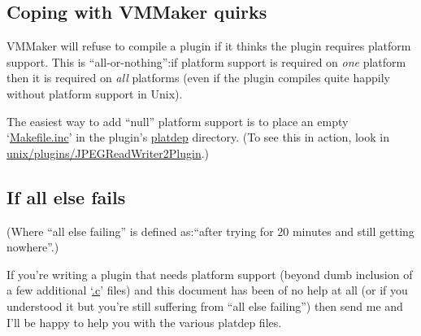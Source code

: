 \documentclass{article}
\newcommand{\cmd}{\url}
\newcommand{\cmd}{\texttt}
\begin{document}
\subsection{Coping with VMMaker quirks}

VMMaker
will refuse to compile a plugin if it thinks the plugin
requires platform support.  This is ``all-or-nothing'':\@ if platform
support is required on \emph{one} platform then it is required on
\emph{all} platforms (even if the plugin compiles quite happily
without platform support in Unix).

The easiest way to add ``null'' platform support is to place an empty
`\cmd{Makefile.inc}' in the plugin's \cmd{platdep} directory.  (To see
this in action, look in \cmd{unix/plugins/JPEGReadWriter2Plugin}.)

\subsection{If all else fails}

(Where
``all else failing'' is defined as:\@ ``after trying for 20
minutes and still getting nowhere''.)

If you're writing a plugin that needs platform support (beyond dumb
inclusion of a few additional `\cmd{.c}' files) and this document has
been of no help at all (or if you understood it but you're still
suffering from ``all else failing'') then send me
and I'll be
happy to help you with the various platdep files.



\printindex
\end{document}
